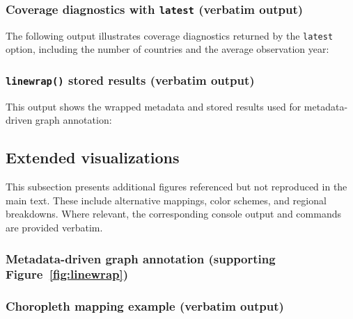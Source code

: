 \documentclass[bib]{statapress}
\begin{document}
\subsubsection{Coverage diagnostics with \texttt{latest} (verbatim output)}
The following output illustrates coverage diagnostics returned by the
\texttt{latest} option, including the number of countries and the average
observation year:
\begin{stlog}
\nullskip
\end{stlog}

\subsubsection{\texttt{linewrap()} stored results (verbatim output)}
This output shows the wrapped metadata and stored results used for
metadata-driven graph annotation:
\begin{stlog}
\nullskip
\end{stlog}

\subsection{Extended visualizations}\label{app:examples:viz}

This subsection presents additional figures referenced but not reproduced in
the main text. These include alternative mappings, color schemes, and regional
breakdowns. Where relevant, the corresponding console output and commands are
provided verbatim.

\subsubsection{Metadata-driven graph annotation (supporting Figure~\ref{fig:linewrap})}\label{app:examples:viz:linewrap} 
\begin{stlog}
\nullskip
\end{stlog}

\subsubsection{Choropleth mapping example (verbatim output)}
\begin{stlog}
\nullskip
\end{stlog}
\end{document}
